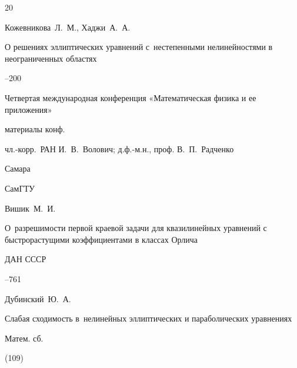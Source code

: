 \RusRef



\begin{thebibliography}{20}




\by Кожевникова~Л.~М., Хаджи~А.~А.

\paper  О решениях эллиптических уравнений с~нестепенными нелинейностями в неограниченных областях

--200

\inbook Четвертая международная конференция «Математическая физика и ее приложения»

\bookinfo материалы конф.

\eds чл.-корр.~РАН И.~В.~Волович; д.ф.-м.н., проф. В.~П.~Радченко

\publaddr Самара

\publ СамГТУ







\by Вишик~М.~И.

\paper О~разрешимости первой краевой задачи для квазилинейных уравнений с быстрорастущими коэффициентами в классах Орлича

\jour ДАН СССР




--761









\by Дубинский~Ю.~А.

\paper Слабая сходимость в~нелинейных эллиптических и параболических уравнениях

\jour Матем. сб.


(109)


\end{thebibliography}
